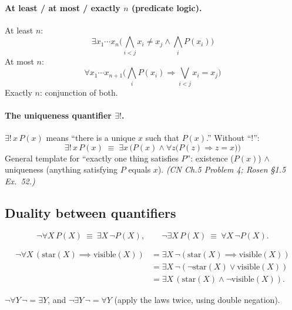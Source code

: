 \documentclass[11pt]{article}
\begin{document}
\paragraph{At least / at most / exactly $n$ (predicate logic).}
At least $n$:
\[
\exists x_1\cdots x_n\Big(\bigwedge_{i<j}x_i\neq x_j \wedge \bigwedge_i P(x_i)\Big)
\]
At most $n$:
\[
\forall x_1\cdots x_{n+1}\Big(\bigwedge_i P(x_i)\Rightarrow \bigvee_{i<j}x_i=x_j\Big)
\]
Exactly $n$: conjunction of both.

\paragraph{The uniqueness quantifier $\exists!$.} $\exists!\,x\,P(x)$
means ``there is a unique $x$ such that $P(x)$.'' Without ``$!$'':
\[
\exists!\,x\,P(x) \;\equiv\; \exists x\,\Big(P(x)\wedge\forall z\big(P(z)\Rightarrow z=x\big)\Big)
\]
General template for ``exactly one thing satisfies $P$'':
existence ($P(x)$) $\wedge$ uniqueness (anything satisfying $P$
equals $x$). \emph{(CN Ch.5 Problem 4; Rosen \S1.5 Ex.\ 52.)}

\subsection{Duality between quantifiers}
\label{sec:5-13}

\begin{theorem}
\[
\neg\forall X\, P(X) \ \equiv\ \exists X\,\neg P(X), \qquad \neg\exists X\, P(X) \ \equiv\ \forall X\,\neg P(X).
\]
\end{theorem}

\begin{example}[``Not all stars are visible'' $=$ ``some star is invisible'']
\begin{align*}
\neg\forall X\,(\mathrm{star}(X)\implies\mathrm{visible}(X))
&= \exists X\,\neg(\mathrm{star}(X)\implies\mathrm{visible}(X)) \\
&= \exists X\,\neg(\neg\mathrm{star}(X)\vee\mathrm{visible}(X)) \\
&= \exists X\,(\mathrm{star}(X)\wedge\neg\mathrm{visible}(X)).
\end{align*}
\end{example}

\begin{note}
$\neg\forall Y\,\neg = \exists Y$, and $\neg\exists Y\,\neg = \forall Y$ (apply the laws twice, using double negation).
\end{note}
\end{document}
